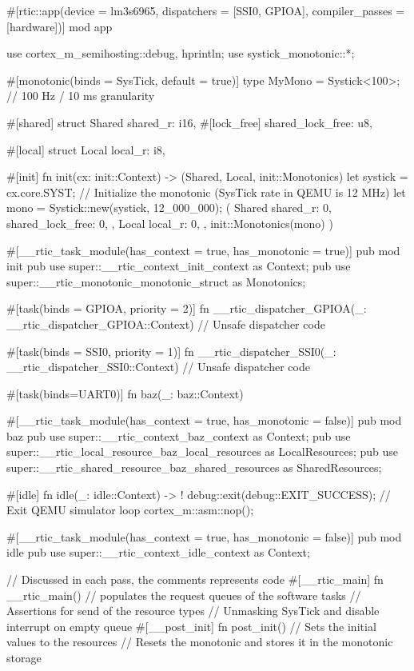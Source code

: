 #[rtic::app(device = lm3s6965, dispatchers = [SSI0, GPIOA], 
    compiler_passes = [hardware])]
mod app {
    use cortex_m_semihosting::{debug, hprintln};
    use systick_monotonic::*;

    #[monotonic(binds = SysTick, default = true)]
    type MyMono = Systick<100>; // 100 Hz / 10 ms granularity

    #[shared]
    struct Shared {
        shared_r: i16,
        #[lock_free]
        shared_lock_free: u8,
    }

    #[local]
    struct Local {
        local_r: i8,
    }

    #[init]
    fn init(cx: init::Context) -> (Shared, Local, init::Monotonics) {
        let systick = cx.core.SYST;
        // Initialize the monotonic (SysTick rate in QEMU is 12 MHz)
        let mono = Systick::new(systick, 12_000_000);
        (
            Shared {
                shared_r: 0,
                shared_lock_free: 0,
            }, 
            Local {
                local_r: 0,
            }, 
            init::Monotonics(mono)
        )
    }
    
    #[__rtic_task_module(has_context = true, has_monotonic = true)]
    pub mod init {
        pub use super::__rtic_context_init_context as Context;
        pub use super::__rtic_monotonic_monotonic_struct as Monotonics;
    }

    #[task(binds = GPIOA, priority = 2)]
    fn __rtic_dispatcher_GPIOA(_: __rtic_dispatcher_GPIOA::Context) {
        // Unsafe dispatcher code
    }

    #[task(binds = SSI0, priority = 1)]
    fn __rtic_dispatcher_SSI0(_: __rtic_dispatcher_SSI0::Context) {
        // Unsafe dispatcher code
    }

    #[task(binds=UART0)]
    fn baz(_: baz::Context){
    }

    #[__rtic_task_module(has_context = true, has_monotonic = false)]
    pub mod baz {
        pub use super::__rtic_context_baz_context as Context;
        pub use super::__rtic_local_resource_baz_local_resources as LocalResources;
        pub use super::__rtic_shared_resource_baz_shared_resources as SharedResources;
    }

    #[idle]
    fn idle(_: idle::Context) -> ! {
        debug::exit(debug::EXIT_SUCCESS); // Exit QEMU simulator
        loop {
            cortex_m::asm::nop();
        }
    }

    #[__rtic_task_module(has_context = true, has_monotonic = false)]
    pub mod idle {
        pub use super::__rtic_context_idle_context as Context;
    }

    // Discussed in each pass, the comments represents code
    #[__rtic_main]
    fn __rtic_main() {
        // populates the request queues of the software tasks
        // Assertions for send of the resource types
        // Unmasking SysTick and disable interrupt on empty queue
        #[__post_init]
        fn post_init() {
            // Sets the initial values to the resources
            // Resets the monotonic and stores it in the monotonic storage
        }
    }
}